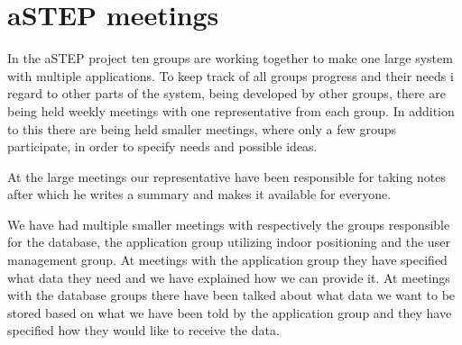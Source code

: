 \section{aSTEP meetings}
In the aSTEP project ten groups are working together to make one large system with multiple applications. To keep track of all groups progress and their needs i regard to other parts of the system, being developed by other groups, there are being held weekly meetings with one representative from each group. In addition to this there are being held smaller meetings, where only a few groups participate, in order to specify needs and possible ideas.

At the large meetings our representative have been responsible for taking notes after which he writes a summary and makes it available for everyone.

We have had multiple smaller meetings with respectively the groups responsible for the database, the application group utilizing indoor positioning and the user management group. At meetings with the application group they have specified what data they need and we have explained how we can provide it. At meetings with the database groups there have been talked about what data we want to be stored based on what we have been told by the application group and they have specified how they would like to receive the data. 
